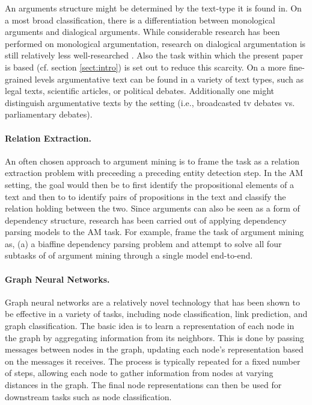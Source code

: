 \documentclass[11pt]{article}
\begin{document}
An arguments structure might be determined by the text-type it is found in. On a most broad classification, there is a differentiation between monological arguments and dialogical arguments. While considerable research has been performed on monological argumentation, research on dialogical argumentation is still relatively less well-researched \citep{budzynska_towards_2014}. Also the task within which the present paper is based (cf. section \ref{sect:intro}) is set out to reduce this scarcity. On a more fine-grained levels argumentative text can be found in a variety of text types, such as legal texts, scientific articles, or political debates. Additionally one might distinguish argumentative texts by the setting (i.e., broadcasted tv debates vs. parliamentary debates).

\paragraph{Relation Extraction.} An often chosen approach to argument mining is to frame the task as a relation extraction problem with preceeding a preceding entity detection step. In the AM setting, the goal would then be to first identify the propositional elements of a text and then to to identify pairs of propositions in the text and classify the relation holding between the two.
Since arguments can also be seen as a form of dependency structure, research has been carried out of applying dependency parsing models to the AM task. For example, \citet{ye_end--end_2021} frame the task of argument mining as, (a) a biaffine dependency parsing problem and attempt to solve all four subtasks of of argument mining through a single model end-to-end. 

\paragraph{Graph Neural Networks.} Graph neural networks are a relatively novel technology that has been shown to be effective in a variety of tasks, including node classification, link prediction, and graph classification. 
The basic idea is to learn a representation of each node in the graph by aggregating information from its neighbors. 
This is done by passing messages between nodes in the graph, updating each node's representation based on the messages it receives. 
The process is typically repeated for a fixed number of steps, allowing each node to gather information from nodes at varying distances in the graph. 
The final node representations can then be used for downstream tasks such as node classification.  
\end{document}
